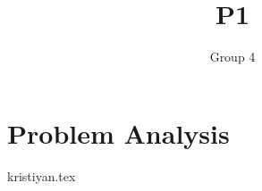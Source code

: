 \documentclass[11pt]{report}
\title{P1}
\author{Group 4}
\begin{document}
    \maketitle

    \chapter{Problem Analysis}
    {kristiyan.tex}

    \newpage
    
    
\end{document}
